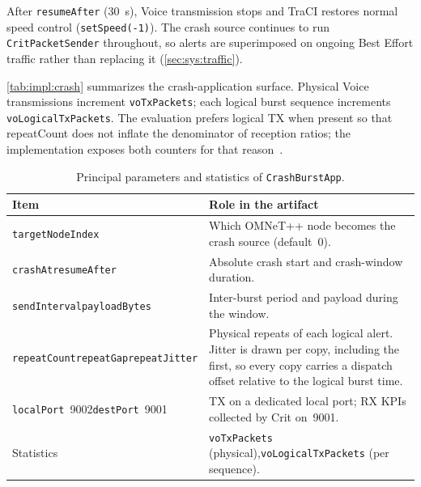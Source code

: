 After \texttt{resumeAfter} (30~s), Voice transmission stops and TraCI restores normal speed control (\texttt{setSpeed(-1)}).
The crash source continues to run \texttt{CritPacketSender} throughout, so alerts are superimposed on ongoing Best Effort traffic rather than replacing it (\autoref{sec:sys:traffic}).

\autoref{tab:impl:crash} summarizes the crash-application surface.
Physical Voice transmissions increment \texttt{voTxPackets}; each logical burst sequence increments \texttt{voLogicalTxPackets}.
The evaluation prefers logical TX when present so that repeatCount does not inflate the denominator of reception ratios; the implementation exposes both counters for that reason~\cite{aguiar2026_veins_qos}.

\begin{table}[htb]
	\ABNTEXfontereduzida
	\caption{\label{tab:impl:crash}Principal parameters and statistics of \texttt{CrashBurstApp}.}
	\begin{center}
		\begin{tabularx}{\linewidth}{@{}>{\raggedright\arraybackslash}p{4.2cm} >{\raggedright\arraybackslash}X@{}}
			\toprule
			\textbf{Item} & \textbf{Role in the artifact} \\
			\midrule
			\texttt{targetNodeIndex} &
			  Which OMNeT++ node becomes the crash source (default~0). \\
			\addlinespace
			\texttt{crashAt}\newline\texttt{resumeAfter} &
			  Absolute crash start and crash-window duration. \\
			\addlinespace
			\texttt{sendInterval}\newline\texttt{payloadBytes} &
			  Inter-burst period and payload during the window. \\
			\addlinespace
			\texttt{repeatCount}\newline\texttt{repeatGap}\newline\texttt{repeatJitter} &
			  Physical repeats of each logical alert. Jitter is drawn per copy, including the first, so every copy carries a dispatch offset relative to the logical burst time. \\
			\addlinespace
			\texttt{localPort}~9002\newline\texttt{destPort}~9001 &
			  TX on a dedicated local port; RX KPIs collected by Crit on~9001. \\
			\addlinespace
			Statistics &
			  \texttt{voTxPackets} (physical),\newline\texttt{voLogicalTxPackets} (per sequence). \\
			\bottomrule
		\end{tabularx}
	\end{center}
\end{table}

